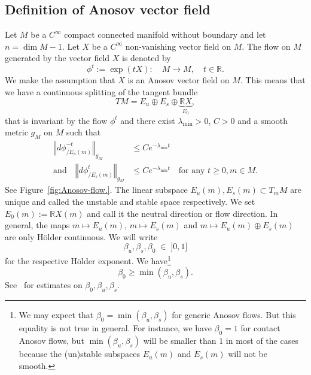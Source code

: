 \documentclass[AHL,Unicode,longabstracts,published]{cedram}
\newcommand{\bbR}{\mathbb{R}}
\newcommand{\bbR}{\mathbb{R}}
\begin{document}
\subsection{Definition of Anosov vector field}

Let $M$ be a $C^{\infty}$ compact connected manifold without boundary and let $n=\dim M-1$. Let $X$ be a $C^{\infty}$ non-vanishing vector field on $M$. The flow on $M$ generated by the vector field $X$ is denoted by
\begin{equation}\label{eq:flow_map}
\phi^{t}:=\exp\left(tX\right):\quad M\rightarrow M,\quad t\in\bbR.
\end{equation}
We make the assumption that $X$ is an Anosov vector field on $M$. This means that we have a continuous splitting of the tangent bundle
\begin{equation}\label{eq:decomp_TM}
TM=E_{u}\oplus E_{s}\oplus\underbrace{\bbR X}_{E_{0}},
\end{equation}
that is invariant by the flow $\phi^{t}$ and there exist $\lambda_{\min}>0$, $C>0$ and a smooth metric $g_{M}$ on $M$ such that
\begin{equation}\label{eq:hyperbolicity}
\begin{split}
\left\Vert d\phi_{/E_{u}\left(m\right)}^{-t}\right\Vert _{g_{M}} &\leq Ce^{-\lambda_{\min}t}\\
\text{and}\quad\left\Vert d\phi_{/E_{s}\left(m\right)}^{t}\right\Vert _{g_{M}} &\leq Ce^{-\lambda_{\min}t}\quad\text{for any }t\geq0,m\in M.
\end{split}
\end{equation}
See Figure~\ref{fig:Anosov-flow.}. The linear subspace $E_{u}(m),E_{s}(m)\subset T_{m}M$ are unique and called the unstable and stable space respectively. We set $E_{0}(m):=\bbR X(m)$ and call it the neutral direction or flow direction. In general, the maps $m\mapsto E_{u}(m)$, $m\mapsto E_{s}(m)$ and $m\mapsto E_{u}(m)\oplus E_{s}(m)$ are only H\"older continuous. We will write
\begin{equation}\label{eq:Holder_exp}
\beta_{u},\beta_{s},\beta_{0}\;\in\;]0,1]
\end{equation}
for the respective H\"older exponent. We have\footnote{We may expect that $\beta_{0}=\min(\beta_{u},\beta_{s})$ for generic Anosov flows. But this equality is not true in general. For instance, we have $\beta_{0}=1$ for contact Anosov flows, but $\min(\beta_{u},\beta_{s})$ will be smaller than $1$ in most of the cases because the (un)stable subspaces $E_{u}(m)$ and $E_{s}(m)$ will not be smooth.}
\begin{equation}\label{eq:def_beta_*}
\beta_{0}\geq\min\left(\beta_{u},\beta_{s}\right).
\end{equation}
See~\cite{hasselblatt1994regularity,hurder-90} for estimates on $\beta_{0},\beta_{u},\beta_{s}$.
\end{document}
